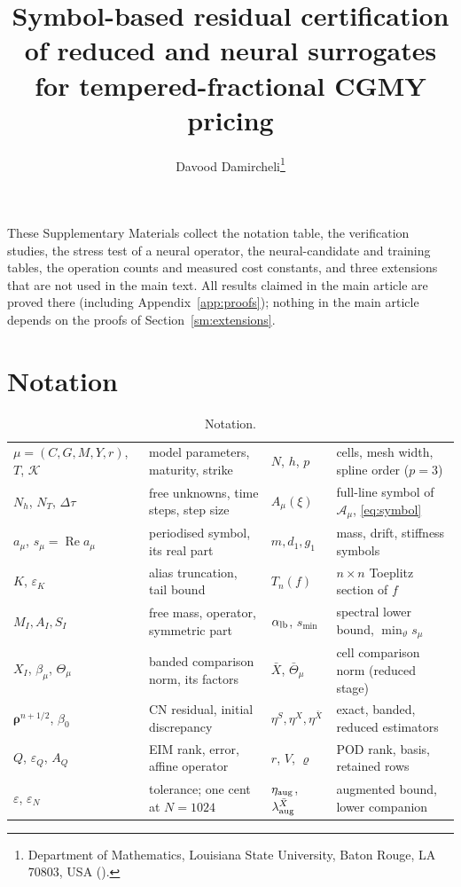 \documentclass[supplement,hidelinks]{siamart251216}
\title{Symbol-based residual certification of reduced and neural surrogates for tempered-fractional CGMY pricing}
\author{Davood Damircheli\thanks{Department of Mathematics, Louisiana State University, Baton Rouge, LA 70803, USA
(\email{ddamircheli@lsu.edu}).}}
\newcommand{\dt}{\Delta\tau}
\newcommand{\rr}{\bm\rho}
\newcommand{\Aop}{\mathcal A_\mu}
\DeclareMathOperator{\Real}{Re}
\newcommand{\Tn}[2]{T_{#1}(#2)}          %
\newcommand{\sym}[1]{#1}                 %
\newcommand{\smin}{s_{\min}}
\newcommand{\Thmu}{\Theta_\mu}
\begin{document}
\maketitle
\noindent These Supplementary Materials collect the notation table, the verification studies, the
stress test of a neural operator, the neural-candidate and training tables, the operation counts and
measured cost constants, and three extensions that are not used in the main text.  All results
claimed in the main article are proved there (including Appendix~\ref{app:proofs}); nothing in the
main article depends on the proofs of Section~\ref{sm:extensions}.

\section{Notation}
\label{sm:notation}
\begin{table}[ht]
\centering\footnotesize
\caption{Notation.}
\label{tab:notation}
\begin{tabular}{@{}l@{\ \ }>{\raggedright\arraybackslash}p{3.3cm}@{\ \ }l@{\ \ }>{\raggedright\arraybackslash}p{3.3cm}@{}}
\toprule
$\mu=(C,G,M,Y,r)$, $T$, $\mathcal K$ & model parameters, maturity, strike &
$N$, $h$, $p$ & cells, mesh width, spline order ($p=3$)\\
$N_h$, $N_T$, $\dt$ & free unknowns, time steps, step size &
$A_\mu(\xi)$ & full-line symbol of $\Aop$, \eqref{eq:symbol}\\
$\sym{a}_\mu$, $\sym{s}_\mu=\Real\sym{a}_\mu$ & periodised symbol, its real part &
$\sym{m},\sym{d}_1,\sym{g}_1$ & mass, drift, stiffness symbols\\
$K$, $\varepsilon_K$ & alias truncation, tail bound &
$\Tn{n}{f}$ & $n\times n$ Toeplitz section of $f$\\
$M_I,A_I,S_I$ & free mass, operator, symmetric part &
$\alpha_{\rm lb}$, $\smin$ & spectral lower bound, $\min_\vartheta\sym{s}_\mu$\\
$X_I$, $\beta_\mu$, $\Thmu$ & banded comparison norm, its factors &
$\bar X$, $\bar\Theta_\mu$ & cell comparison norm (reduced stage)\\
$\rr^{n+1/2}$, $\beta_0$ & CN residual, initial discrepancy &
$\eta^S,\eta^X,\eta^{\bar X}$ & exact, banded, reduced estimators\\
$Q$, $\varepsilon_Q$, $A_Q$ & EIM rank, error, affine operator &
$r$, $V$, $\varrho$ & POD rank, basis, retained rows\\
$\varepsilon$, $\varepsilon_N$ & tolerance; one cent at $N=1024$ &
$\eta_{\rm aug}$, $\lambda^{\bar X}_{\rm aug}$ & augmented bound, lower companion\\
\bottomrule
\end{tabular}
\end{table}
\end{document}
